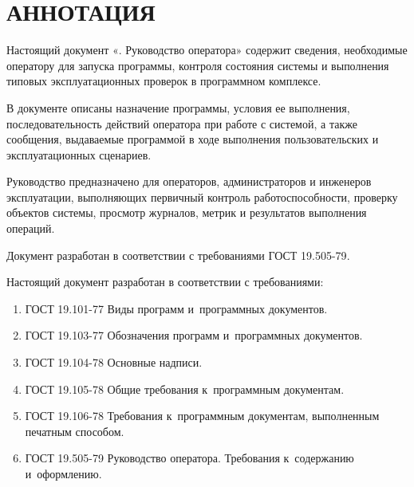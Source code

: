 \documentclass[12pt,a4paper]{extarticle}
\begin{document}
\sloppy




\section*{АННОТАЦИЯ}

Настоящий документ «\projectname. Руководство оператора» содержит сведения, необходимые оператору для запуска программы, контроля состояния системы и выполнения типовых эксплуатационных проверок в программном комплексе.

В документе описаны назначение программы, условия ее выполнения, последовательность действий оператора при работе с системой, а также сообщения, выдаваемые программой в ходе выполнения пользовательских и эксплуатационных сценариев.

Руководство предназначено для операторов, администраторов и инженеров эксплуатации, выполняющих первичный контроль работоспособности, проверку объектов системы, просмотр журналов, метрик и результатов выполнения операций.

Документ разработан в соответствии с требованиями ГОСТ 19.505-79\cite{gost19505}.

\clearpage

\noindent
Настоящий документ разработан в соответствии с требованиями:

\begin{enumerate}[label=\arabic*), leftmargin=1.25cm]
\item ГОСТ 19.101-77 Виды программ и~программных документов\cite{gost19101}.
\item ГОСТ 19.103-77 Обозначения программ и~программных документов\cite{gost19103}.
\item ГОСТ 19.104-78 Основные надписи\cite{gost19104}.
\item ГОСТ 19.105-78 Общие требования к~программным документам\cite{gost19105}.
\item ГОСТ 19.106-78 Требования к~программным документам, выполненным печатным способом\cite{gost19106}.
\item ГОСТ 19.505-79 Руководство оператора. Требования к~содержанию и~оформлению\cite{gost19505}.
\end{enumerate}
\end{document}
